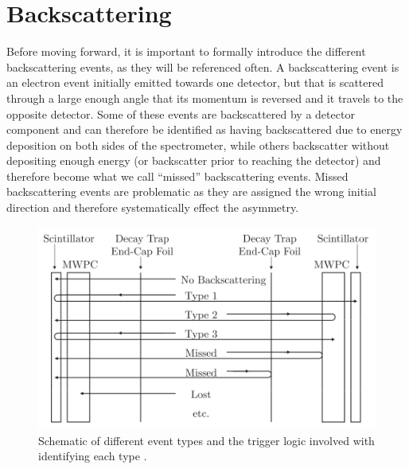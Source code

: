 \section{Backscattering} \label{sec:backscattering}
Before moving forward, it is important to formally introduce the different
backscattering events, as they will be referenced often. A backscattering
event is an electron event initially emitted towards one detector, but that
is scattered through a large enough angle that its momentum is reversed and
it travels to the opposite detector. Some of these events are backscattered
by a detector component and can therefore be identified as having backscattered
due to energy deposition on both sides of the spectrometer,
while others backscatter without depositing enough energy (or backscatter prior
to reaching the detector) and therefore become what we call ``missed''
backscattering events. Missed backscattering events are problematic as they
are assigned the wrong initial direction and therefore systematically effect
the asymmetry.

\begin{figure}[h]
\centering
\includegraphics[scale=.4]{3-UCNAAnalysis/backscatterSchematic.png}
\caption{Schematic of different event types and the trigger logic involved with identifying
  each type \cite{plaster2012}.}
\label{fig:backscatterSchematic}
\end{figure}

